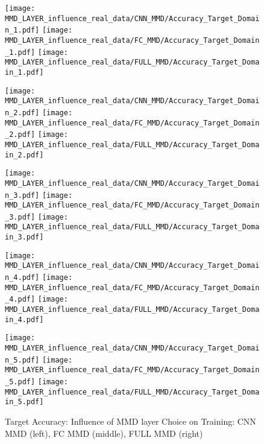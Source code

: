 \begin{figure}[htp]
  \centering

  \texttt{[image: MMD\_LAYER\_influence\_real\_data/CNN\_MMD/Accuracy\_Target\_Domain\_1.pdf]}
  \hspace{.1cm}
  \texttt{[image: MMD\_LAYER\_influence\_real\_data/FC\_MMD/Accuracy\_Target\_Domain\_1.pdf]}
  \hspace{.1cm}
  \texttt{[image: MMD\_LAYER\_influence\_real\_data/FULL\_MMD/Accuracy\_Target\_Domain\_1.pdf]}

  \vspace{.3cm}

  \texttt{[image: MMD\_LAYER\_influence\_real\_data/CNN\_MMD/Accuracy\_Target\_Domain\_2.pdf]}
  \hspace{.1cm}
  \texttt{[image: MMD\_LAYER\_influence\_real\_data/FC\_MMD/Accuracy\_Target\_Domain\_2.pdf]}
  \hspace{.1cm}
  \texttt{[image: MMD\_LAYER\_influence\_real\_data/FULL\_MMD/Accuracy\_Target\_Domain\_2.pdf]}

  \vspace{.3cm}

  \texttt{[image: MMD\_LAYER\_influence\_real\_data/CNN\_MMD/Accuracy\_Target\_Domain\_3.pdf]}
  \hspace{.1cm}
  \texttt{[image: MMD\_LAYER\_influence\_real\_data/FC\_MMD/Accuracy\_Target\_Domain\_3.pdf]}
  \hspace{.1cm}
  \texttt{[image: MMD\_LAYER\_influence\_real\_data/FULL\_MMD/Accuracy\_Target\_Domain\_3.pdf]}
  
    \vspace{.3cm}

  \texttt{[image: MMD\_LAYER\_influence\_real\_data/CNN\_MMD/Accuracy\_Target\_Domain\_4.pdf]}
  \hspace{.1cm}
  \texttt{[image: MMD\_LAYER\_influence\_real\_data/FC\_MMD/Accuracy\_Target\_Domain\_4.pdf]}
  \hspace{.1cm}
  \texttt{[image: MMD\_LAYER\_influence\_real\_data/FULL\_MMD/Accuracy\_Target\_Domain\_4.pdf]}
  
    \vspace{.3cm}
    
  \texttt{[image: MMD\_LAYER\_influence\_real\_data/CNN\_MMD/Accuracy\_Target\_Domain\_5.pdf]}
  \hspace{.1cm}
  \texttt{[image: MMD\_LAYER\_influence\_real\_data/FC\_MMD/Accuracy\_Target\_Domain\_5.pdf]}
  \hspace{.1cm}
  \texttt{[image: MMD\_LAYER\_influence\_real\_data/FULL\_MMD/Accuracy\_Target\_Domain\_5.pdf]}


  \caption{Target Accuracy: Influence of MMD layer Choice on Training: CNN MMD (left), FC MMD (middle), FULL MMD (right)}
  \label{fig:target_accuracy_MMD_layer}
\end{figure}



